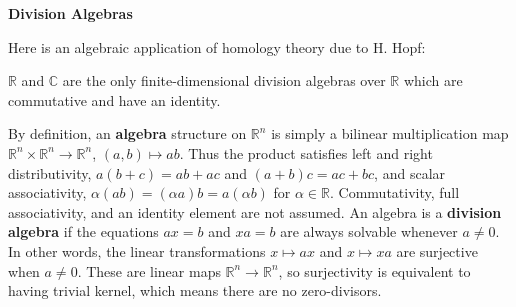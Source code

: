 \textbf{Division Algebras}

Here is an algebraic application of homology theory due to H. Hopf:

\begin{theorem}
\label{thm:real-complex-division-algebras}
$\mathbb{R}$ and $\mathbb{C}$ are the only finite-dimensional division algebras over $\mathbb{R}$ which are commutative and have an identity.
\end{theorem}

By definition, an \textbf{algebra} structure on $\mathbb{R}^n$ is simply a bilinear multiplication map $\mathbb{R}^n \times \mathbb{R}^n \to \mathbb{R}^n$, $(a,b) \mapsto ab$. Thus the product satisfies left and right distributivity, $a(b+c) = ab + ac$ and $(a+b)c = ac + bc$, and scalar associativity, $\alpha(ab) = (\alpha a)b = a(\alpha b)$ for $\alpha \in \mathbb{R}$. Commutativity, full associativity, and an identity element are not assumed. An algebra is a \textbf{division algebra} if the equations $ax = b$ and $xa = b$ are always solvable whenever $a \neq 0$. In other words, the linear transformations $x \mapsto ax$ and $x\mapsto xa$ are surjective when $a \neq 0$. These are linear maps $\mathbb{R}^n \to \mathbb{R}^n$, so surjectivity is equivalent to having trivial kernel, which means there are no zero-divisors.

